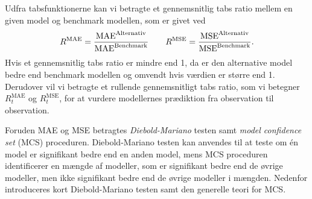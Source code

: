 Udfra tabsfunktionerne kan vi betragte et gennemsnitlig tabs ratio mellem en given model og benchmark modellen, som er givet ved
\begin{align*}
R^{\text{MAE}} = \frac{\text{MAE}^{\text{Alternativ}}}{\text{MAE}^{\text{Benchmark}}} \qquad R^{\text{\text{MSE}}} = \frac{\text{MSE}^{\text{Alternativ}}}{\text{MSE}^{\text{Benchmark}}}.
\end{align*} 
Hvis et gennemsnitlig tabs ratio er mindre end 1, da er den alternative model bedre end benchmark modellen og omvendt hvis værdien er større end 1. 
Derudover vil vi betragte et rullende gennemsnitligt tabs ratio, som vi betegner $R_t^\text{MAE}$ og $R_{t}^\text{MSE}$, for at vurdere modellernes prædiktion fra observation til observation.
%

Foruden MAE og MSE betragtes \textit{Diebold-Mariano} testen samt \textit{model confidence set} (MCS) proceduren.
Diebold-Mariano testen kan anvendes til at teste om én model er signifikant bedre end en anden model, mens MCS proceduren identificerer en mængde af modeller, som er signifikant bedre end de øvrige modeller, men ikke signifikant bedre end de øvrige modeller i mængden.
Nedenfor introduceres kort Diebold-Mariano testen samt den generelle teori for MCS.



